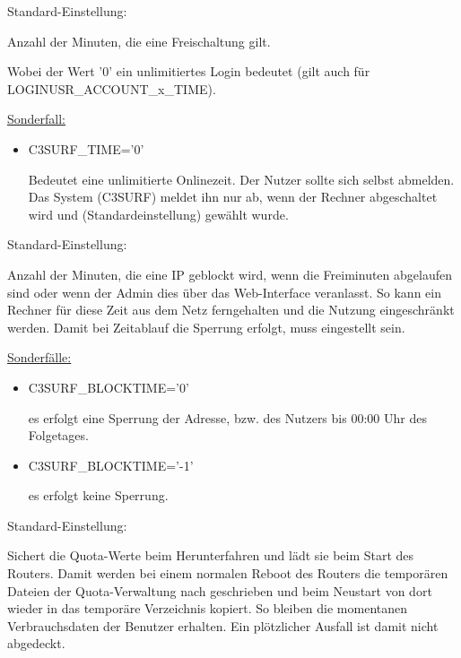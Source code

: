 \begin{itemize}
\begin{description}
  Standard-Einstellung: 

  Anzahl der Minuten, die eine Freischaltung gilt. 

  Wobei der Wert '0' ein unlimitiertes Login bedeutet (gilt auch für \\
  LOGINUSR\_ACCOUNT\_x\_TIME).

  \underline{Sonderfall:}
    \begin{itemize}
      \item{C3SURF\_TIME='0'}
      
      Bedeutet eine unlimitierte Onlinezeit. Der Nutzer sollte sich selbst abmelden.
      Das System (C3SURF) meldet ihn nur ab, wenn der Rechner abgeschaltet wird und
       (Standardeinstellung) gewählt wurde.
    \end{itemize}


  Standard-Einstellung: 

  Anzahl der Minuten, die eine IP geblockt wird, wenn die Freiminuten
  abgelaufen sind oder wenn der Admin dies über das Web-Interface
  veranlasst. So kann ein Rechner für diese Zeit aus dem Netz ferngehalten
  und die Nutzung eingeschränkt werden. Damit bei Zeitablauf die
  Sperrung erfolgt, muss  eingestellt sein.

  \underline{Sonderfälle:}\\
    \begin{itemize}
      \item{C3SURF\_BLOCKTIME='0'}
            
            es erfolgt eine Sperrung der Adresse, bzw. des Nutzers bis 00:00 Uhr
            des Folgetages.
       \item{C3SURF\_BLOCKTIME='-1'}
             
             es erfolgt keine Sperrung.
     \end{itemize}
     


  Standard-Einstellung: 

  Sichert die Quota-Werte beim Herunterfahren und lädt sie beim
  Start des Routers. Damit werden bei einem normalen Reboot des Routers die
  temporären Dateien der Quota-Verwaltung nach 
  {} geschrieben und beim Neustart von dort wieder
  in das temporäre Verzeichnis kopiert. So bleiben die momentanen
  Verbrauchsdaten der Benutzer erhalten. Ein plötzlicher Ausfall ist damit
  nicht abgedeckt.


\end{description}
\end{itemize}
